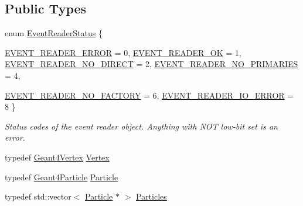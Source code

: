 \subsection*{Public Types}
\begin{DoxyCompactItemize}
\item 
enum \hyperlink{class_d_d4hep_1_1_simulation_1_1_geant4_event_reader_ae4f4bc83ffcf5b0c1868ad78859851e7}{EventReaderStatus} \{ \par
\hyperlink{class_d_d4hep_1_1_simulation_1_1_geant4_event_reader_ae4f4bc83ffcf5b0c1868ad78859851e7aaeb5bf886e4f7638fadf42796cd8b771}{EVENT\_\-READER\_\-ERROR} = 0, 
\hyperlink{class_d_d4hep_1_1_simulation_1_1_geant4_event_reader_ae4f4bc83ffcf5b0c1868ad78859851e7a13d6e75077901770699fb70535bd24f5}{EVENT\_\-READER\_\-OK} = 1, 
\hyperlink{class_d_d4hep_1_1_simulation_1_1_geant4_event_reader_ae4f4bc83ffcf5b0c1868ad78859851e7ae95cba86bedc0b790fd088cadd03f0ad}{EVENT\_\-READER\_\-NO\_\-DIRECT} = 2, 
\hyperlink{class_d_d4hep_1_1_simulation_1_1_geant4_event_reader_ae4f4bc83ffcf5b0c1868ad78859851e7a0f764338e1ac94712d2d957cda746d0d}{EVENT\_\-READER\_\-NO\_\-PRIMARIES} = 4, 
\par
\hyperlink{class_d_d4hep_1_1_simulation_1_1_geant4_event_reader_ae4f4bc83ffcf5b0c1868ad78859851e7ad87b1d312f8a452aa2e351a5b6939af4}{EVENT\_\-READER\_\-NO\_\-FACTORY} = 6, 
\hyperlink{class_d_d4hep_1_1_simulation_1_1_geant4_event_reader_ae4f4bc83ffcf5b0c1868ad78859851e7a228cd68e3e7f8d4562f18996cae80e46}{EVENT\_\-READER\_\-IO\_\-ERROR} = 8
 \}
\begin{DoxyCompactList}\small\item\em Status codes of the event reader object. Anything with NOT low-\/bit set is an error. \item\end{DoxyCompactList}\item 
typedef \hyperlink{class_d_d4hep_1_1_simulation_1_1_geant4_vertex}{Geant4Vertex} \hyperlink{class_d_d4hep_1_1_simulation_1_1_geant4_event_reader_ac9738208fe520e5aa2ad1efa13de82e7}{Vertex}
\item 
typedef \hyperlink{class_d_d4hep_1_1_simulation_1_1_geant4_particle}{Geant4Particle} \hyperlink{class_d_d4hep_1_1_simulation_1_1_geant4_event_reader_ad37f7aa722da2299517d66b4568a6a4a}{Particle}
\item 
typedef std::vector$<$ \hyperlink{class_d_d4hep_1_1_simulation_1_1_geant4_particle}{Particle} $\ast$ $>$ \hyperlink{class_d_d4hep_1_1_simulation_1_1_geant4_event_reader_afa252e93d319aef2810a17aa78bb4603}{Particles}
\end{DoxyCompactItemize}
